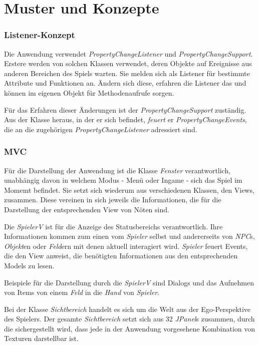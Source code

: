 \chapter{Muster und Konzepte}

\subsection{Listener-Konzept}
Die Anwendung verwendet \textit{PropertyChangeListener} und \textit{PropertyChangeSupport}.
Erstere werden von solchen Klassen verwendet, deren Objekte auf Ereignisse aus anderen Bereichen des \gls{Spiel}s warten.
Sie melden sich als Listener für bestimmte Attribute und Funktionen an. Ändern sich diese, erfahren die Listener
das und können im eigenen Objekt für Methodenaufrufe sorgen.
 
Für das Erfahren dieser Änderungen ist der \textit{PropertyChangeSupport} zuständig. 
Aus der Klasse heraus, in der er sich befindet, \textit{feuert} er \textit{PropertyChangeEvents}, 
die an die zugehörigen \textit{PropertyChangeListener} adressiert sind.

\subsection{MVC}
Für die Darstellung der Anwendung ist die Klasse \textit{Fenster} verantwortlich, unabhängig davon in welchem Modus 
- Menü oder Ingame - sich das \gls{Spiel} im Momemt befindet. Sie setzt sich wiederum aus verschiedenen Klassen, 
den Views, zusammen. Diese vereinen in sich jeweils die Informationen, die für die Darstellung der entsprechenden 
View von Nöten sind.

Die \textit{SpielerV} ist für die Anzeige des \gls{Statusbereich}s verantwortlich. Ihre Informationen kommen zum einen vom
\textit{Spieler} selbst und andererseits von \textit{NPC}s, \textit{Objekt}en oder \textit{Feld}ern mit denen aktuell interagiert wird.
\textit{Spieler} feuert Events, die den View anweist, die benötigten Informationen aus den entsprechenden Models zu lesen.
 
Beispiele für die Darstellung durch die \textit{SpielerV} sind \glspl{Dialog} und das Aufnehmen von \glspl{Item} von 
einem \textit{Feld} in die \textit{Hand} von \textit{Spieler}.

Bei der Klasse \textit{Sichtbereich} handelt es sich um die \gls{Welt} aus der Ego-Perspektive des \gls{Spieler}s.
Der gesamte \textit{Sichtbereich} setzt sich aus 32 \textit{JPanel}s zusammen, durch die sichergestellt wird, dass jede in der
Anwendung vorgesehene Kombination von Texturen darstellbar ist.

